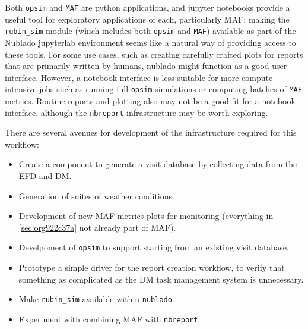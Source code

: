 Both \texttt{opsim} and \texttt{MAF} are python applications, and jupyter notebooks provide a useful tool for exploratory applications of each, particularly MAF: making the \texttt{rubin\_sim} module (which includes both \texttt{opsim} and \texttt{MAF}) available as part of the Nublado jupyterlab environment seems like a natural way of providing access to these tools. For some use cases, such as creating carefully crafted plots for reports that are primarily written by humans, nublado might function as a good user interface. However, a notebook interface is less suitable for more compute intensive jobs such as running full \texttt{opsim} simulations or computing batches of \texttt{MAF} metrics. Routine reports and plotting also may not be a good fit for a notebook interface, although the \texttt{nbreport} infrastructure may be worth exploring.

There are several avenues for development of the infrastructure required for this workflow:
\begin{itemize}
\item Create a component to generate a visit database by collecting data from the EFD and DM.
\item Generation of suites of weather conditions.
\item Development of new MAF metrics plots for monitoring (everything in \ref{sec:org922c37a} not already part of MAF).
\item Develpoment of \texttt{opsim} to support starting from an existing visit database.
\item Prototype a simple driver for the report creation workflow, to verify that something as complicated as the DM task management system is unnecessary.
\item Make \texttt{rubin\_sim} available within \texttt{nublado}.
\item Experiment with combining MAF with \texttt{nbreport}.
\end{itemize}
